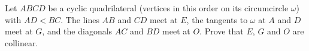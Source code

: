 Let $ABCD$ be a cyclic quadrilateral (vertices in this order on its circumcircle $\omega$) with $AD<BC$. The lines $AB$ and $CD$ meet at $E$, the tangents to $\omega$ at $A$ and $D$ meet at $G$, and the diagonals $AC$ and $BD$ meet at $O$. Prove that $E$, $G$ and $O$ are collinear.
